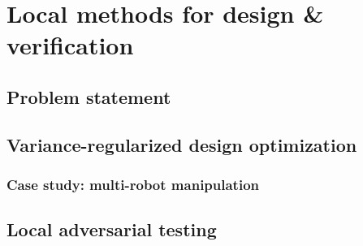 
\section{Local methods for design \& verification}\label{section:local_methods}




\subsection{Problem statement}



\subsection{Variance-regularized design optimization}



\subsubsection{Case study: multi-robot manipulation}





\subsection{Local adversarial testing}


